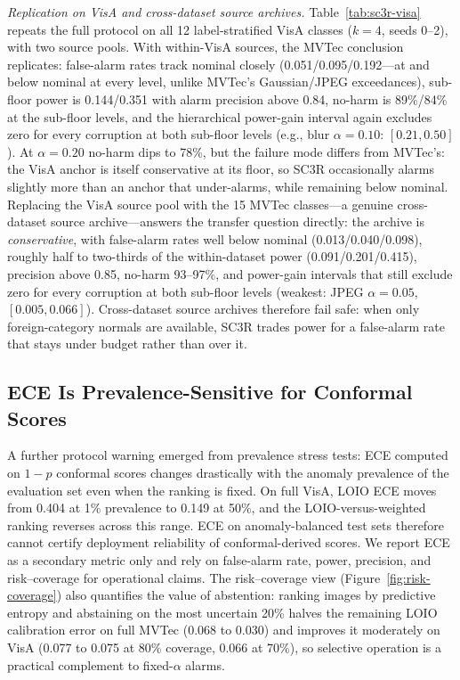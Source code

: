 
\emph{Replication on VisA and cross-dataset source archives.} Table~\ref{tab:sc3r-visa} repeats the full protocol on all 12 label-stratified VisA classes ($k{=}4$, seeds 0--2), with two source pools. With within-VisA sources, the MVTec conclusion replicates: false-alarm rates track nominal closely (0.051/0.095/0.192---at and below nominal at every level, unlike MVTec's Gaussian/JPEG exceedances), sub-floor power is 0.144/0.351 with alarm precision above 0.84, no-harm is 89\%/84\% at the sub-floor levels, and the hierarchical power-gain interval again excludes zero for every corruption at both sub-floor levels (e.g., blur $\alpha{=}0.10$: $[0.21,0.50]$). At $\alpha{=}0.20$ no-harm dips to 78\%, but the failure mode differs from MVTec's: the VisA anchor is itself conservative at its floor, so SC3R occasionally alarms slightly more than an anchor that under-alarms, while remaining below nominal. Replacing the VisA source pool with the 15 MVTec classes---a genuine cross-dataset source archive---answers the transfer question directly: the archive is \emph{conservative}, with false-alarm rates well below nominal (0.013/0.040/0.098), roughly half to two-thirds of the within-dataset power (0.091/0.201/0.415), precision above 0.85, no-harm 93--97\%, and power-gain intervals that still exclude zero for every corruption at both sub-floor levels (weakest: JPEG $\alpha{=}0.05$, $[0.005,0.066]$). Cross-dataset source archives therefore fail safe: when only foreign-category normals are available, SC3R trades power for a false-alarm rate that stays under budget rather than over it.

\subsection{ECE Is Prevalence-Sensitive for Conformal Scores}
A further protocol warning emerged from prevalence stress tests: ECE computed on $1-p$ conformal scores changes drastically with the anomaly prevalence of the evaluation set even when the ranking is fixed. On full VisA, LOIO ECE moves from 0.404 at 1\% prevalence to 0.149 at 50\%, and the LOIO-versus-weighted ranking reverses across this range. ECE on anomaly-balanced test sets therefore cannot certify deployment reliability of conformal-derived scores. We report ECE as a secondary metric only and rely on false-alarm rate, power, precision, and risk--coverage for operational claims. The risk--coverage view (Figure~\ref{fig:risk-coverage}) also quantifies the value of abstention: ranking images by predictive entropy and abstaining on the most uncertain 20\% halves the remaining LOIO calibration error on full MVTec (0.068 to 0.030) and improves it moderately on VisA (0.077 to 0.075 at 80\% coverage, 0.066 at 70\%), so selective operation is a practical complement to fixed-$\alpha$ alarms.

